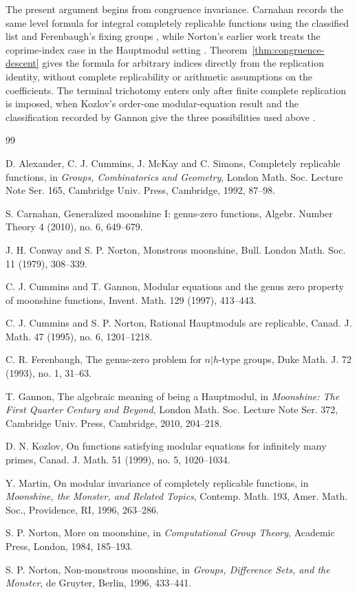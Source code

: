 \documentclass[12pt]{amsart}
\theoremstyle{definition}
\theoremstyle{remark}
\numberwithin{equation}{section}
\begin{document}
The present argument begins from congruence invariance. Carnahan records the same level formula for integral completely replicable functions using the classified list and Ferenbaugh's fixing groups \cite[Corollary~5.6]{carnahan}, while Norton's earlier work treats the coprime-index case in the Hauptmodul setting \cite{norton-nonmonstrous,cummins-norton}. Theorem~\ref{thm:congruence-descent} gives the formula for arbitrary indices directly from the replication identity, without complete replicability or arithmetic assumptions on the coefficients. The terminal trichotomy enters only after finite complete replication is imposed, when Kozlov's order-one modular-equation result and the classification recorded by Gannon give the three possibilities used above \cite{kozlov,gannon-hauptmodul}.


\begin{thebibliography}{99}

D. Alexander, C. J. Cummins, J. McKay and C. Simons,
Completely replicable functions,
in \emph{Groups, Combinatorics and Geometry}, London Math. Soc. Lecture Note Ser. 165,
Cambridge Univ. Press, Cambridge, 1992, 87--98.

S. Carnahan,
Generalized moonshine I: genus-zero functions,
Algebr. Number Theory 4 (2010), no. 6, 649--679.

J. H. Conway and S. P. Norton,
Monstrous moonshine,
Bull. London Math. Soc. 11 (1979), 308--339.

C. J. Cummins and T. Gannon,
Modular equations and the genus zero property of moonshine functions,
Invent. Math. 129 (1997), 413--443.

C. J. Cummins and S. P. Norton,
Rational Hauptmoduls are replicable,
Canad. J. Math. 47 (1995), no. 6, 1201--1218.

C. R. Ferenbaugh,
The genus-zero problem for $n|h$-type groups,
Duke Math. J. 72 (1993), no. 1, 31--63.

T. Gannon,
The algebraic meaning of being a Hauptmodul,
in \emph{Moonshine: The First Quarter Century and Beyond}, London Math. Soc. Lecture Note Ser. 372,
Cambridge Univ. Press, Cambridge, 2010, 204--218.

D. N. Kozlov,
On functions satisfying modular equations for infinitely many primes,
Canad. J. Math. 51 (1999), no. 5, 1020--1034.

Y. Martin,
On modular invariance of completely replicable functions,
in \emph{Moonshine, the Monster, and Related Topics}, Contemp. Math. 193,
Amer. Math. Soc., Providence, RI, 1996, 263--286.

S. P. Norton,
More on moonshine,
in \emph{Computational Group Theory}, Academic Press, London, 1984, 185--193.


S. P. Norton,
Non-monstrous moonshine,
in \emph{Groups, Difference Sets, and the Monster},
de Gruyter, Berlin, 1996, 433--441.

\end{thebibliography}
\end{document}
